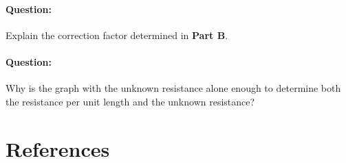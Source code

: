 \begin{refsection}
\begin{question}
\paragraph{Question:} Explain the correction factor determined in \textbf{Part B}. 
\paragraph{Question:} Why is the graph with the unknown resistance alone enough to determine both the resistance per unit length and the unknown resistance?
\end{question}

\section*{References}



\nocite{worsnop_advanced_1951}

\printbibliography[heading=none]


\newpage

\end{refsection}